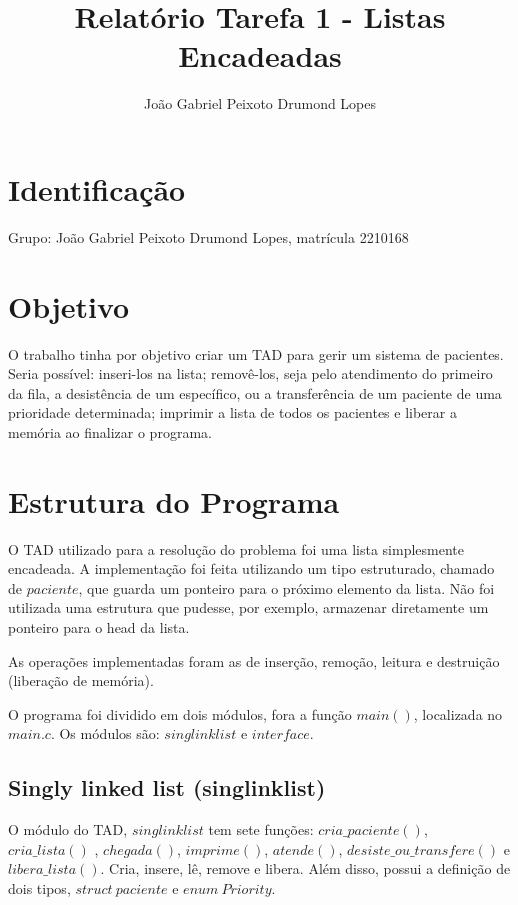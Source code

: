 \documentclass{article}
\title{Relatório Tarefa 1 - Listas Encadeadas}
\author{João Gabriel Peixoto Drumond Lopes}
\begin{document}
\maketitle

\section{Identificação}
Grupo: João Gabriel Peixoto Drumond Lopes, matrícula 2210168

\section{Objetivo}
O trabalho tinha por objetivo criar um TAD para gerir um sistema de pacientes. Seria possível: inseri-los na lista; removê-los, seja pelo atendimento do primeiro da fila, a desistência de um específico, ou a transferência de um paciente de uma prioridade determinada; imprimir a lista de todos os pacientes e liberar a memória ao finalizar o programa.

\section{Estrutura do Programa}
O TAD utilizado para a resolução do problema foi uma lista simplesmente encadeada. A implementação foi feita utilizando um tipo estruturado, chamado de $paciente$, que guarda um ponteiro para o próximo elemento da lista. Não foi utilizada uma estrutura que pudesse, por exemplo, armazenar diretamente um ponteiro para o head da lista.

As operações implementadas foram as de inserção, remoção, leitura e destruição (liberação de memória).

O programa foi dividido em dois módulos, fora a função $main()$, localizada no $main.c$. Os módulos são: $singlinklist$ e $interface$. 

\subsection{Singly linked list (singlinklist)}
O módulo do TAD, $singlinklist$ tem sete funções: $cria\_paciente()$, $cria\_lista()$ , $chegada()$, $imprime()$, $atende()$, $desiste\_ou\_transfere()$ e $libera\_lista()$. Cria, insere, lê, remove e libera. Além disso, possui a definição de dois tipos, $struct\ paciente$ e $enum\ Priority$.
\end{document}
